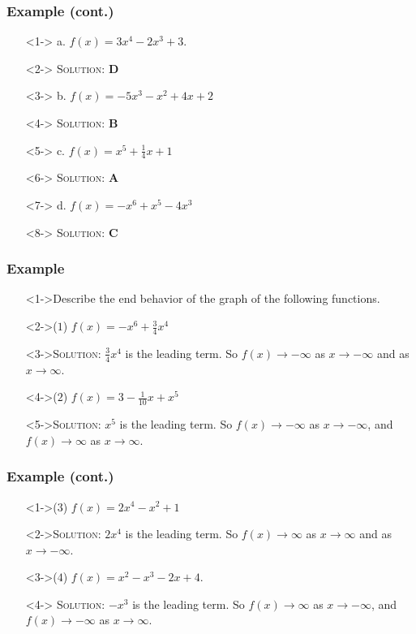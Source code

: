 \documentclass{beamer}
\begin{document}
\begin{frame}
  \frametitle{Example (cont.)}
    \begin{enumerate}
      \item[]<1-> a. $f(x)=3x^{4}-2x^{3}+3$.
      \item[]<2-> \textsc{Solution:} \textbf{D}
      \item[]<3-> b. $f(x)=-5x^{3}-x^{2}+4x+2$
      \item[]<4-> \textsc{Solution:} \textbf{B}
      \item[]<5-> c. $f(x)=x^{5}+\frac{1}{4}x+1$
      \item[]<6-> \textsc{Solution:} \textbf{A}
      \item[]<7-> d. $f(x)=-x^{6}+x^{5}-4x^{3}$
      \item[]<8-> \textsc{Solution:} \textbf{C}
    \end{enumerate}
\end{frame}

\begin{frame}
  \frametitle{Example}
  \begin{enumerate}
    \item[]<1->Describe the end behavior of the graph of the following functions.
    \item[]<2->($1$) $f(x)=-x^{6}+\frac{3}{4}x^{4}$
    \item[]<3->\textsc{Solution:} $\frac{3}{4}x^{4}$ is the leading term. So $f(x) \rightarrow -\infty$ as $x \rightarrow -\infty$ and as $x \rightarrow \infty$.
    \item[]<4->($2$) $f(x)=3-\frac{1}{10}x+x^{5}$
    \item[]<5->\textsc{Solution:} $x^{5}$ is the leading term. So $f(x) \rightarrow -\infty$ as $x \rightarrow -\infty$, and $f(x) \rightarrow \infty$ as $x \rightarrow \infty$.
  \end{enumerate}
\end{frame}

\begin{frame}
  \frametitle{Example (cont.)}
  \begin{enumerate}
    \item[]<1->($3$) $f(x)=2x^{4}-x^{2}+1$
    \item[]<2->\textsc{Solution:} $2x^{4}$ is the leading term.  So $f(x) \rightarrow \infty$ as $x \rightarrow \infty$ and as $x \rightarrow -\infty$.
    \item[]<3->($4$) $f(x)=x^{2}-x^{3}-2x+4$.
    \item[]<4-> \textsc{Solution:} $-x^{3}$ is the leading term.  So $f(x) \rightarrow \infty$ as $x \rightarrow -\infty$, and $f(x) \rightarrow -\infty$ as $x \rightarrow \infty$.
  \end{enumerate}
\end{frame}
\end{document}
